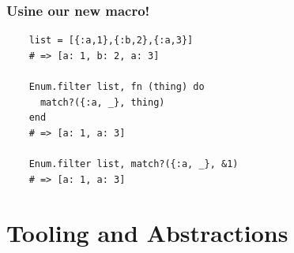 \documentclass{beamer}
\begin{document}
\begin{frame}[fragile]
  \frametitle{Usine our new macro!}
  \begin{lstlisting}
    list = [{:a,1},{:b,2},{:a,3}]
    # => [a: 1, b: 2, a: 3]

    Enum.filter list, fn (thing) do
      match?({:a, _}, thing)
    end
    # => [a: 1, a: 3]

    Enum.filter list, match?({:a, _}, &1)
    # => [a: 1, a: 3]
  \end{lstlisting}
\end{frame}

\section[Section]{Tooling and Abstractions}
  
\end{document}
